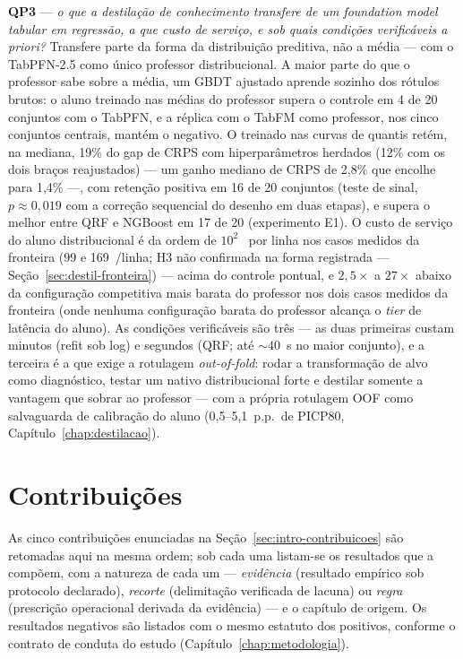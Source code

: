 \textbf{QP3} --- \emph{o que a destilação de conhecimento transfere de
um foundation model tabular em regressão, a que custo de serviço, e sob
quais condições verificáveis a priori?} Transfere parte da forma da
distribuição preditiva, não a média --- com o TabPFN-2.5 como único
professor distribucional. A maior parte do que o professor
sabe sobre a média, um GBDT ajustado aprende sozinho dos rótulos
brutos: o aluno treinado nas médias do professor supera o controle em
4 de 20 conjuntos com o TabPFN, e a réplica com o TabFM como
professor, nos cinco conjuntos centrais, mantém o negativo. O
treinado nas curvas de quantis retém, na mediana, 19\% do gap de CRPS
com hiperparâmetros herdados (12\% com os dois braços reajustados)
--- um ganho mediano de CRPS de 2,8\% que encolhe para 1,4\% ---,
com retenção positiva em 16 de 20 conjuntos (teste de sinal,
$p\approx0{,}019$ com a correção sequencial do desenho em duas
etapas), e supera o melhor entre QRF e NGBoost em 17 de 20
(experimento E1). O custo de serviço do aluno distribucional é da
ordem de $10^{2}$~\us{} por linha nos casos medidos da fronteira (99 e
169~\us/linha; H3 não confirmada na forma registrada ---
Seção~\ref{sec:destil-fronteira}) --- acima do controle
pontual, e $2{,}5\times$ a $27\times$ abaixo da configuração
competitiva mais barata do professor nos dois casos medidos da
fronteira (onde nenhuma configuração barata do professor alcança o
\emph{tier} de latência do aluno). As
condições verificáveis são três --- as duas primeiras custam
minutos (refit sob log) e segundos (QRF; até ${\sim}40$~s no maior
conjunto), e a terceira é a que exige a rotulagem \emph{out-of-fold}:
rodar a transformação de alvo como diagnóstico, testar um nativo
distribucional forte e destilar somente a vantagem que sobrar ao
professor --- com a própria rotulagem OOF como salvaguarda de
calibração do aluno (0,5--5,1~p.p.\ de PICP80,
Capítulo~\ref{chap:destilacao}).

\section{Contribuições}
\label{sec:conc-contribuicoes}

As cinco contribuições enunciadas na Seção~\ref{sec:intro-contribuicoes}
são retomadas aqui na mesma ordem; sob cada uma listam-se os
resultados que a compõem, com a natureza de cada um ---
\emph{evidência} (resultado empírico sob protocolo declarado),
\emph{recorte} (delimitação verificada de lacuna) ou \emph{regra}
(prescrição operacional derivada da evidência) --- e o capítulo de
origem. Os resultados negativos são listados com o mesmo estatuto dos
positivos, conforme o contrato de conduta do estudo
(Capítulo~\ref{chap:metodologia}).

